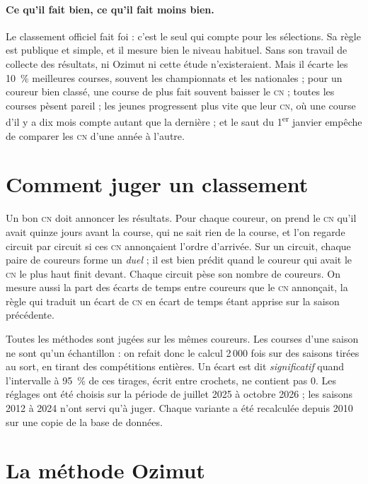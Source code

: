 \documentclass[11pt,a4paper]{article}
\newcommand{\CN}{\textsc{cn}}
\begin{document}
\paragraph{Ce qu'il fait bien, ce qu'il fait moins bien.} Le classement officiel fait foi : c'est le seul qui compte pour les sélections. Sa règle est publique et simple, et il mesure bien le niveau habituel. Sans son travail de collecte des résultats, ni Ozimut ni cette étude n'existeraient. Mais il écarte les 10~\% meilleures courses, souvent les championnats et les nationales ; pour un coureur bien classé, une course de plus fait souvent baisser le \CN{} ; toutes les courses pèsent pareil ; les jeunes progressent plus vite que leur \CN{}, où une course d'il y a dix mois compte autant que la dernière ; et le saut du 1\textsuperscript{er} janvier empêche de comparer les \CN{} d'une année à l'autre.

\section{Comment juger un classement}

Un bon \CN{} doit annoncer les résultats. Pour chaque coureur, on prend le \CN{} qu'il avait quinze jours avant la course, qui ne sait rien de la course, et l'on regarde circuit par circuit si ces \CN{} annonçaient l'ordre d'arrivée. Sur un circuit, chaque paire de coureurs forme un \emph{duel} ; il est bien prédit quand le coureur qui avait le \CN{} le plus haut finit devant. Chaque circuit pèse son nombre de coureurs. On mesure aussi la part des écarts de temps entre coureurs que le \CN{} annonçait, la règle qui traduit un écart de \CN{} en écart de temps étant apprise sur la saison précédente.

Toutes les méthodes sont jugées sur les mêmes coureurs. Les courses d'une saison ne sont qu'un échantillon : on refait donc le calcul 2\,000 fois sur des saisons tirées au sort, en tirant des compétitions entières. Un écart est dit \emph{significatif} quand l'intervalle à 95~\% de ces tirages, écrit entre crochets, ne contient pas 0. Les réglages ont été choisis sur la période de juillet 2025 à octobre 2026 ; les saisons 2012 à 2024 n'ont servi qu'à juger. Chaque variante a été recalculée depuis 2010 sur une copie de la base de données.

\section{La méthode Ozimut}
\end{document}
